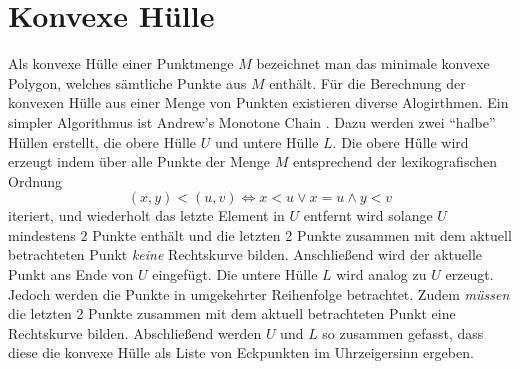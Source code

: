 \section*{Konvexe Hülle}

Als konvexe Hülle einer Punktmenge $M$ bezeichnet man das minimale konvexe
Polygon, welches sämtliche Punkte aus $M$ enthält.
Für die Berechnung der konvexen Hülle aus einer Menge von Punkten existieren
diverse Alogirthmen.
Ein simpler Algorithmus ist Andrew's Monotone Chain \cite{compgeom2008}.
Dazu werden zwei "`halbe"' Hüllen erstellt, die obere Hülle $U$ und untere Hülle
$L$.
Die obere Hülle wird erzeugt indem über alle Punkte der Menge $M$ entsprechend
der lexikografischen Ordnung
  \[ (x,y) < (u, v) \Longleftrightarrow x < u \vee x = u \wedge y < v \]
iteriert, und wiederholt das letzte Element in $U$ entfernt wird solange $U$
mindestens 2 Punkte enthält und die letzten 2 Punkte zusammen mit dem aktuell
betrachteten Punkt \emph{keine} Rechtskurve bilden.
Anschließend wird der aktuelle Punkt ans Ende von $U$ eingefügt.
Die untere Hülle $L$ wird analog zu $U$ erzeugt.
Jedoch werden die Punkte in umgekehrter Reihenfolge betrachtet.
Zudem \emph{müssen} die letzten 2 Punkte zusammen mit dem aktuell betrachteten
Punkt eine Rechtskurve bilden. Abschließend werden $U$ und $L$ so zusammen
gefasst, dass diese die konvexe Hülle als Liste von Eckpunkten im Uhrzeigersinn
ergeben.
